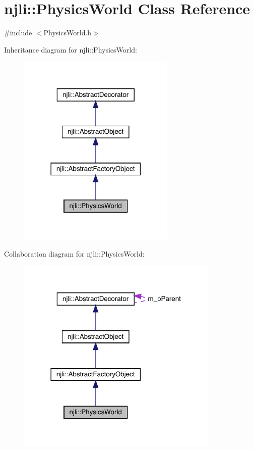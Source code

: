 \hypertarget{classnjli_1_1_physics_world}{}\section{njli\+:\+:Physics\+World Class Reference}
\label{classnjli_1_1_physics_world}


{\ttfamily \#include $<$Physics\+World.\+h$>$}



Inheritance diagram for njli\+:\+:Physics\+World\+:\nopagebreak
\begin{figure}[H]
\begin{center}
\leavevmode
\includegraphics[width=213pt]{classnjli_1_1_physics_world__inherit__graph}
\end{center}
\end{figure}


Collaboration diagram for njli\+:\+:Physics\+World\+:\nopagebreak
\begin{figure}[H]
\begin{center}
\leavevmode
\includegraphics[width=273pt]{classnjli_1_1_physics_world__coll__graph}
\end{center}
\end{figure}
